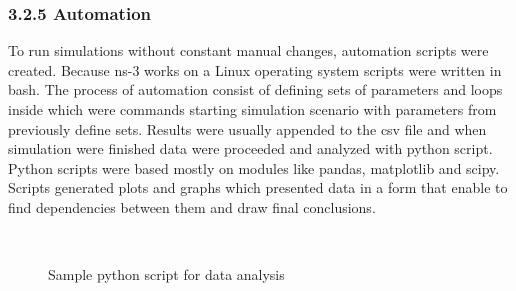\subsubsection{\hspace*{0.5cm}3.2.5 Automation}
\textnormal{\hspace{0.5cm}To run simulations without constant manual changes, automation scripts were created. Because ns-3 works on a Linux operating system scripts were written in bash. The process of automation consist of defining sets of parameters and loops inside which were commands starting simulation scenario with parameters from previously define sets. Results were usually appended to the csv file and when simulation were finished data were proceeded and analyzed with python script. Python scripts were based mostly on modules like pandas, matplotlib and scipy. Scripts generated plots and graphs which presented data in a form that enable to find dependencies between them and draw final conclusions. }
\begin{center}
	\begin{figure}[h]
		\centering
		\\
		\caption{Sample python script for data analysis}
	\end{figure}
\end{center} 

